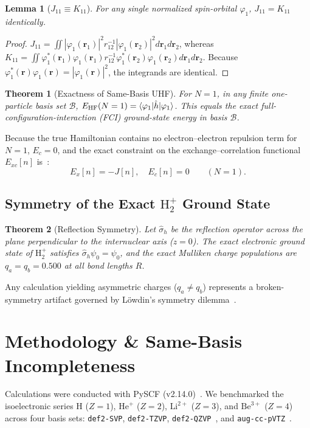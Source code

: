 \documentclass[conference]{IEEEtran}
\newtheorem{theorem}{Theorem}
\newtheorem{lemma}{Lemma}
\begin{document}
\begin{lemma}[$J_{11} \equiv K_{11}$]
For any single normalized spin-orbital $\varphi_1$, $J_{11} = K_{11}$ identically.
\end{lemma}
\begin{proof}
$J_{11} = \iint |\varphi_1(\mathbf r_1)|^2 r_{12}^{-1} |\varphi_1(\mathbf r_2)|^2 d\mathbf r_1 d\mathbf r_2$, whereas $K_{11} = \iint \varphi_1^*(\mathbf r_1)\varphi_1(\mathbf r_1) r_{12}^{-1} \varphi_1^*(\mathbf r_2)\varphi_1(\mathbf r_2) d\mathbf r_1 d\mathbf r_2$. Because $\varphi_1^*(\mathbf r)\varphi_1(\mathbf r) = |\varphi_1(\mathbf r)|^2$, the integrands are identical.
\end{proof}

\begin{theorem}[Exactness of Same-Basis UHF]
\label{thm:hf_exact}
For $N=1$, in any finite one-particle basis set $\mathcal{B}$, $E_{\rm HF}(N=1) = \langle \varphi_1 | \hat h | \varphi_1 \rangle$. This equals the exact full-configuration-interaction (FCI) ground-state energy in basis $\mathcal{B}$.
\end{theorem}
Because the true Hamiltonian contains no electron--electron repulsion term for $N=1$, $E_c = 0$, and the exact constraint on the exchange--correlation functional $E_{xc}[n]$ is~\cite{PZ1981}:
\begin{equation}
E_x[n] = -J[n], \quad E_c[n] = 0 \qquad (N=1).
\label{eq:sic}
\end{equation}

\subsection{Symmetry of the Exact $\text{H}_2^+$ Ground State}
\begin{theorem}[Reflection Symmetry]
\label{thm:sym}
Let $\hat\sigma_h$ be the reflection operator across the plane perpendicular to the internuclear axis ($z=0$). The exact electronic ground state of $\text{H}_2^+$ satisfies $\hat\sigma_h \psi_0 = \psi_0$, and the exact Mulliken charge populations are $q_a = q_b = 0.500$ at all bond lengths $R$.
\end{theorem}
Any calculation yielding asymmetric charges ($q_a \ne q_b$) represents a broken-symmetry artifact governed by Löwdin's symmetry dilemma~\cite{Lowdin1963}.

\section{Methodology \& Same-Basis Incompleteness}
Calculations were conducted with PySCF (v2.14.0)~\cite{PySCF2018,PySCF2020}. We benchmarked the isoelectronic series $\text{H}$ ($Z=1$), $\text{He}^+$ ($Z=2$), $\text{Li}^{2+}$ ($Z=3$), and $\text{Be}^{3+}$ ($Z=4$) across four basis sets: \texttt{def2-SVP}, \texttt{def2-TZVP}, \texttt{def2-QZVP}~\cite{Weigend2005}, and \texttt{aug-cc-pVTZ}~\cite{Dunning1989}.
\end{document}
